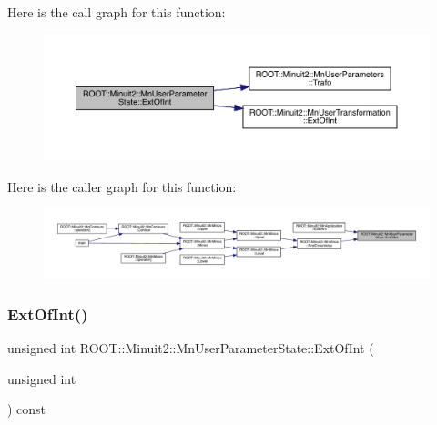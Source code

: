 Here is the call graph for this function\+:\nopagebreak
\begin{figure}[H]
\begin{center}
\leavevmode
\includegraphics[width=350pt]{d3/de0/classROOT_1_1Minuit2_1_1MnUserParameterState_a9ab7bee2faaac9a607d090eb11926150_cgraph}
\end{center}
\end{figure}
Here is the caller graph for this function\+:\nopagebreak
\begin{figure}[H]
\begin{center}
\leavevmode
\includegraphics[width=350pt]{d3/de0/classROOT_1_1Minuit2_1_1MnUserParameterState_a9ab7bee2faaac9a607d090eb11926150_icgraph}
\end{center}
\end{figure}
\mbox{\label{classROOT_1_1Minuit2_1_1MnUserParameterState_a9ab7bee2faaac9a607d090eb11926150}} 
\subsubsection{\texorpdfstring{ExtOfInt()}{ExtOfInt()}\hspace{0.1cm}{\footnotesize\ttfamily [2/2]}}
{\footnotesize\ttfamily unsigned int R\+O\+O\+T\+::\+Minuit2\+::\+Mn\+User\+Parameter\+State\+::\+Ext\+Of\+Int (\begin{DoxyParamCaption}\item[{unsigned int}]{ }\end{DoxyParamCaption}) const}

\mbox{\label{classROOT_1_1Minuit2_1_1MnUserParameterState_a89b898660495dd7fb95bb1c398941e17}} 
